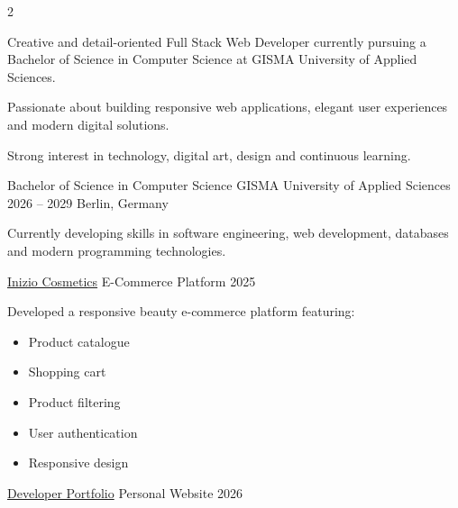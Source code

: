 \documentclass[10pt,a4paper,withhyper]{altacv}
\begin{document}



\makecvheader


\begin{paracol}{2}


Creative and detail-oriented Full Stack Web Developer currently pursuing a Bachelor of Science in Computer Science at GISMA University of Applied Sciences.

Passionate about building responsive web applications, elegant user experiences and modern digital solutions.

Strong interest in technology, digital art, design and continuous learning.


\cvevent
{Bachelor of Science in Computer Science}
{GISMA University of Applied Sciences}
{2026 -- 2029}
{Berlin, Germany}

Currently developing skills in software engineering, web development, databases and modern programming technologies.

\divider


\cvevent
{\href{https://kimberly-makeup.vercel.app/}{Inizio Cosmetics}}
{E-Commerce Platform}
{2025}
{}




Developed a responsive beauty e-commerce platform featuring:

\begin{itemize}
\item Product catalogue
\item Shopping cart
\item Product filtering
\item User authentication
\item Responsive design
\end{itemize}

\divider

\cvevent
{\href{https://your-portfolio-link.com}{Developer Portfolio}}
{Personal Website}
{2026}
{}


\end{paracol}
\end{document}
